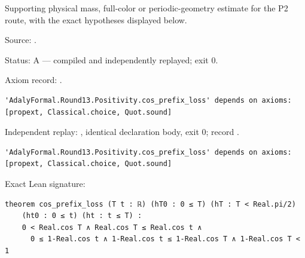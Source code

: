 \begin{theorem}[bp-460]
\label{bp-460}
\uses{}
\leanok
Supporting physical mass, full-color or periodic-geometry estimate for the P2 route, with the exact hypotheses displayed below.

\par Source: \texttt{}.
\par Status: A — compiled and independently replayed; exit 0.
\par Axiom record: \texttt{}.
\begin{verbatim}
'AdalyFormal.Round13.Positivity.cos_prefix_loss' depends on axioms: [propext, Classical.choice, Quot.sound]
\end{verbatim}
\par Independent replay: \texttt{}, identical declaration body, exit 0; record \texttt{}.
\begin{verbatim}
'AdalyFormal.Round13.Positivity.cos_prefix_loss' depends on axioms: [propext, Classical.choice, Quot.sound]
\end{verbatim}
\par Exact Lean signature:
\begin{verbatim}
theorem cos_prefix_loss (T t : ℝ) (hT0 : 0 ≤ T) (hT : T < Real.pi/2)
    (ht0 : 0 ≤ t) (ht : t ≤ T) :
    0 < Real.cos T ∧ Real.cos T ≤ Real.cos t ∧
      0 ≤ 1-Real.cos t ∧ 1-Real.cos t ≤ 1-Real.cos T ∧ 1-Real.cos T < 1
\end{verbatim}
\end{theorem}

